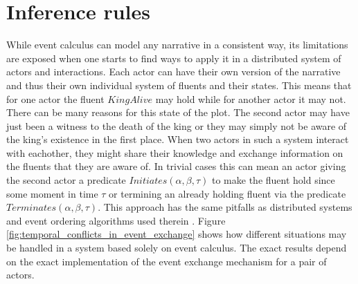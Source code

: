 \section {Inference rules}

While event calculus can model any narrative in a consistent way, its limitations are exposed when one starts to find ways to apply it in a distributed system of actors and interactions.
Each actor can have their own version of the narrative and thus their own individual system of fluents and their states.
This means that for one actor the fluent $KingAlive$ may hold while for another actor it may not.
There can be many reasons for this state of the plot.
The second actor may have just been a witness to the death of the king or they may simply not be aware of the king's existence in the first place.
When two actors in such a system interact with eachother, they might share their knowledge and exchange information on the fluents that they are aware of.
In trivial cases this can mean an actor giving the second actor a predicate $Initiates \left( \alpha, \beta, \tau \right)$ to make the fluent hold since some moment in time $\tau$ or termining an already holding fluent via the predicate $Terminates \left( \alpha, \beta, \tau \right)$.
This approach has the same pitfalls as distributed systems and event ordering algorithms used therein \cite{lamport2019time}.
Figure \ref{fig:temporal_conflicts_in_event_exchange} shows how different situations may be handled in a system based solely on event calculus.
The exact results depend on the exact implementation of the event exchange mechanism for a pair of actors.

